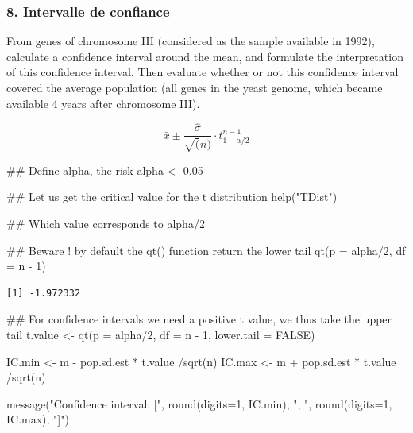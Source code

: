 \documentclass[]{article}
\newenvironment{Shaded}{\begin{snugshade}}{\end{snugshade}}
\newcommand{\KeywordTok}[1]{\textcolor[rgb]{0.94,0.87,0.69}{#1}}
\newcommand{\DataTypeTok}[1]{\textcolor[rgb]{0.87,0.87,0.75}{#1}}
\newcommand{\DecValTok}[1]{\textcolor[rgb]{0.86,0.86,0.80}{#1}}
\newcommand{\FloatTok}[1]{\textcolor[rgb]{0.75,0.75,0.82}{#1}}
\newcommand{\StringTok}[1]{\textcolor[rgb]{0.80,0.58,0.58}{#1}}
\newcommand{\OtherTok}[1]{\textcolor[rgb]{0.94,0.94,0.56}{#1}}
\newcommand{\OperatorTok}[1]{\textcolor[rgb]{0.94,0.94,0.82}{#1}}
\newcommand{\NormalTok}[1]{\textcolor[rgb]{0.80,0.80,0.80}{#1}}
\begin{document}
\subsubsection{8. Intervalle de
confiance}\label{intervalle-de-confiance}

From genes of chromosome III (considered as the sample available in
1992), calculate a confidence interval around the mean, and formulate
the interpretation of this confidence interval. Then evaluate whether or
not this confidence interval covered the average population (all genes
in the yeast genome, which became available 4 years after chromosome
III).

\[ \bar{x} \pm \frac{\hat{\sigma}}{\sqrt(n)} \cdot t_{1-\alpha/2}^{n-1}\]

\begin{Shaded}
\begin{Highlighting}[]
\NormalTok{## Define alpha, the risk}
\NormalTok{alpha <-}\StringTok{ }\FloatTok{0.05}

\NormalTok{## Let us get the critical value for the t distribution}
\KeywordTok{help}\NormalTok{(}\StringTok{"TDist"}\NormalTok{)}

\NormalTok{## Which value corresponds to alpha/2 }

\NormalTok{## Beware ! by default the qt() function return the lower tail}
\KeywordTok{qt}\NormalTok{(}\DataTypeTok{p =}\NormalTok{ alpha}\OperatorTok{/}\DecValTok{2}\NormalTok{, }\DataTypeTok{df =}\NormalTok{  n }\OperatorTok{-}\StringTok{ }\DecValTok{1}\NormalTok{)}
\end{Highlighting}
\end{Shaded}

\begin{verbatim}
[1] -1.972332
\end{verbatim}

\begin{Shaded}
\begin{Highlighting}[]
\NormalTok{## For confidence intervals we need a positive t value, we thus take the upper tail}
\NormalTok{t.value <-}\StringTok{ }\KeywordTok{qt}\NormalTok{(}\DataTypeTok{p =}\NormalTok{ alpha}\OperatorTok{/}\DecValTok{2}\NormalTok{, }\DataTypeTok{df =}\NormalTok{  n }\OperatorTok{-}\StringTok{ }\DecValTok{1}\NormalTok{, }\DataTypeTok{lower.tail =} \OtherTok{FALSE}\NormalTok{)}

\NormalTok{IC.min <-}\StringTok{ }\NormalTok{m }\OperatorTok{-}\StringTok{ }\NormalTok{pop.sd.est }\OperatorTok{*}\StringTok{ }\NormalTok{t.value }\OperatorTok{/}\KeywordTok{sqrt}\NormalTok{(n)}
\NormalTok{IC.max <-}\StringTok{ }\NormalTok{m }\OperatorTok{+}\StringTok{ }\NormalTok{pop.sd.est }\OperatorTok{*}\StringTok{ }\NormalTok{t.value }\OperatorTok{/}\KeywordTok{sqrt}\NormalTok{(n)}

\KeywordTok{message}\NormalTok{(}\StringTok{"Confidence interval: ["}\NormalTok{, }
        \KeywordTok{round}\NormalTok{(}\DataTypeTok{digits=}\DecValTok{1}\NormalTok{, IC.min), }
        \StringTok{", "}\NormalTok{, }
        \KeywordTok{round}\NormalTok{(}\DataTypeTok{digits=}\DecValTok{1}\NormalTok{, IC.max), }\StringTok{"]"}\NormalTok{)}
\end{Highlighting}
\end{Shaded}
\end{document}
